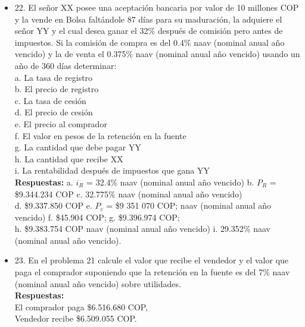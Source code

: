 \begin{itemize}
 \item 22. El señor XX posee una aceptación bancaria por valor de 10 millones COP y la vende en Bolsa faltándole 87 días para su maduración, la adquiere el señor YY y el cual desea ganar el 32\% después de comisión pero antes de impuestos. Si la comisión de compra es del 0.4\% naav (nominal anual año vencido) y la de venta el 0.375\% naav (nominal anual año vencido) usando un año de 360 días determinar:\\
       a.	La tasa de registro\\
       b.	El precio de registro\\
       c.	La tasa de cesión\\
       d.	El precio de cesión\\
       e.	El precio al comprador\\
       f.	El valor en pesos de la retención en la fuente\\
       g.	La cantidad que debe pagar YY\\
       h.	La cantidad que recibe XX\\
       i.	La rentabilidad después de impuestos que gana YY\\
       \textbf{Respuestas:} a. $i_{R}$ = 32.4\% naav (nominal anual año vencido)\hspace{0,5cm}  b. $P_{R}$ = \$9.344.234 COP\hspace{0,5cm}   c. 32.775\% naav (nominal anual año vencido)\hspace{0,5cm}  \\
       d. \$9.337.850 COP\hspace{0,5cm}   e.  $P_{c}$ = \$9 351 070 COP;  naav (nominal anual año vencido)\hspace{0,5cm}    f. \$45.904 COP;  \hspace{0,5cm}   g. \$9.396.974 COP; \hspace{0,5cm}\\
       h. \$9.383.754 COP \hspace{0,5cm} naav (nominal anual año vencido)\hspace{0,5cm}   i. 29.352\% naav (nominal anual año vencido).\\
       \medskip

 \item 23. En el problema 21 calcule el valor que recibe el vendedor y el valor que paga el comprador suponiendo que la retención en la fuente es del 7\% naav (nominal anual año vencido) sobre utilidades.\\
       \textbf{Respuestas:}\\
       El comprador paga \$6.516.680 COP,\\
       Vendedor recibe \$6.509.055 COP.\\
       \medskip


\end{itemize}
